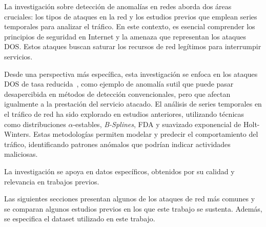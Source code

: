 La investigación sobre detección de anomalías en redes aborda dos áreas cruciales: los tipos de ataques en la red y los estudios previos que emplean series temporales para analizar el tráfico. En este contexto, es esencial comprender los principios de seguridad en Internet y la amenaza que representan los ataques \ac{DOS}. Estos ataques buscan saturar los recursos de red legítimos para interrumpir servicios.

Desde una perspectiva más específica, esta investigación se enfoca en los ataques \ac{DOS} de tasa reducida~\cite{zhang2007low}, como ejemplo de anomalía sutil que puede pasar desapercibida en métodos de detección convencionales, pero que afectan igualmente a la prestación del servicio atacado. El análisis de series temporales en el tráfico de red ha sido explorado en estudios anteriores, utilizando técnicas como distribuciones $\alpha$-estables, \textit{B-Splines}, \ac{FDA} y suavizado exponencial de Holt-Winters. Estas metodologías permiten modelar y predecir el comportamiento del tráfico, identificando patrones anómalos que podrían indicar actividades maliciosas.

La investigación se apoya en datos específicos, obtenidos por su calidad y relevancia en trabajos previos.

Las siguientes secciones presentan algunos de los ataques de red más comunes y se comparan algunos estudios previos en los que este trabajo se sustenta. Además, se especifica el dataset utilizado en este trabajo.
